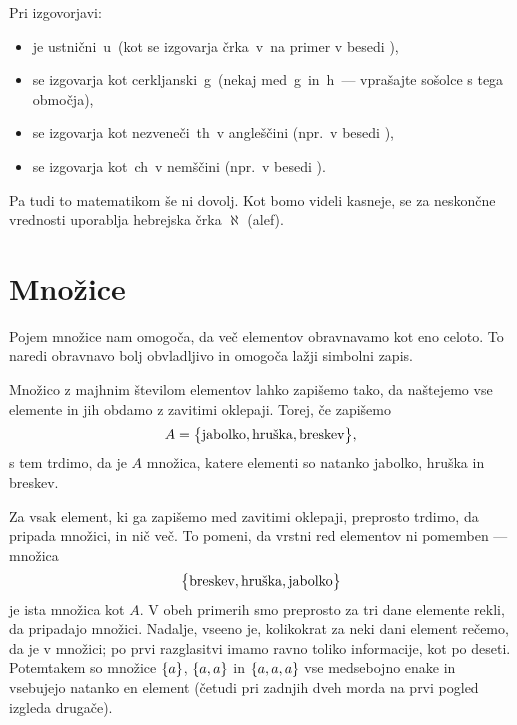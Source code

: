 \begin{table}[!ht]
\begin{flushleft}
				Pri izgovorjavi:
				\vspace{-1ex}
				\begin{itemize}
					\item
						 je ustnični \,u\, (kot se izgovarja črka \,v\, na primer v besedi ),
					\item
						{\textgamma} se izgovarja kot cerkljanski \,g\, (nekaj med \,g\, in \,h\, --- vprašajte sošolce s tega območja),
					\item
						{\scriptsize\textTheta} se izgovarja kot nezveneči \,th\, v angleščini (npr.~v besedi ),
					\item
						{\textchi} se izgovarja kot \,ch\, v nemščini (npr.~v besedi ).
				\end{itemize}
			\end{flushleft}
		\end{table}
		
		Pa tudi to matematikom še ni dovolj. Kot bomo videli kasneje, se za neskončne vrednosti uporablja hebrejska črka $\aleph$ (alef).
	
	
	\section{Množice}\label{RAZDELEK: Množice}
	
		Pojem množice nam omogoča, da več elementov obravnavamo kot eno celoto. To naredi obravnavo bolj obvladljivo in omogoča lažji simbolni zapis.
		
		Množico z majhnim številom elementov lahko zapišemo tako, da naštejemo vse elemente in jih obdamo z zavitimi oklepaji. Torej, če zapišemo
		\[A = \set[1]{\text{jabolko}, \text{hruška}, \text{breskev}},\]
		s tem trdimo, da je $A$ množica, katere elementi so natanko jabolko, hruška in breskev.
		
		Za vsak element, ki ga zapišemo med zavitimi oklepaji, preprosto trdimo, da pripada množici, in nič več. To pomeni, da vrstni red elementov ni pomemben --- množica
		\[\set[1]{\text{breskev}, \text{hruška}, \text{jabolko}}\]
		je ista množica kot $A$. V obeh primerih smo preprosto za tri dane elemente rekli, da pripadajo množici. Nadalje, vseeno je, kolikokrat za neki dani element rečemo, da je v množici; po prvi razglasitvi imamo ravno toliko informacije, kot po deseti. Potemtakem so množice $\set{a}$, $\set{a, a}$ in $\set{a, a, a}$ vse medsebojno enake in vsebujejo natanko en element (četudi pri zadnjih dveh morda na prvi pogled izgleda drugače).
		
